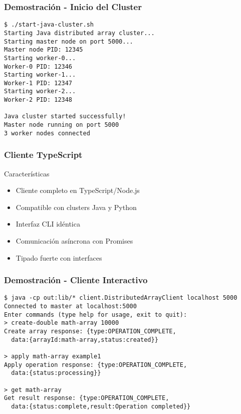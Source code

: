 \documentclass{beamer}
\begin{document}
\begin{frame}[fragile]
\frametitle{Demostración - Inicio del Cluster}
\begin{lstlisting}[style=terminal]
$ ./start-java-cluster.sh
Starting Java distributed array cluster...
Starting master node on port 5000...
Master node PID: 12345
Starting worker-0...
Worker-0 PID: 12346
Starting worker-1...
Worker-1 PID: 12347
Starting worker-2...
Worker-2 PID: 12348

Java cluster started successfully!
Master node running on port 5000
3 worker nodes connected
\end{lstlisting}
\end{frame}

\begin{frame}[fragile]
\frametitle{Cliente TypeScript}
\begin{block}{Características}
    \begin{itemize}
        \item<1-> Cliente completo en TypeScript/Node.js
        \item<2-> Compatible con clusters Java y Python
        \item<3-> Interfaz CLI idéntica
        \item<4-> Comunicación asíncrona con Promises
        \item<5-> Tipado fuerte con interfaces
    \end{itemize}
\end{block}

\end{frame}

\begin{frame}[fragile]
\frametitle{Demostración - Cliente Interactivo}
\begin{lstlisting}[style=terminal]
$ java -cp out:lib/* client.DistributedArrayClient localhost 5000
Connected to master at localhost:5000
Enter commands (type help for usage, exit to quit):
> create-double math-array 10000
Create array response: {type:OPERATION_COMPLETE,
  data:{arrayId:math-array,status:created}}

> apply math-array example1
Apply operation response: {type:OPERATION_COMPLETE,
  data:{status:processing}}

> get math-array
Get result response: {type:OPERATION_COMPLETE,
  data:{status:complete,result:Operation completed}}
\end{lstlisting}
\end{frame}
\end{document}
